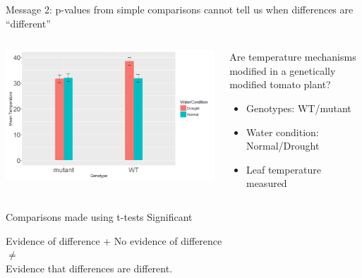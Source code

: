 \documentclass[10pt]{beamer}
\begin{document}
\begin{frame}{Message 2: p-values from simple comparisons cannot tell us when differences are “different”}
 \pause
  \begin{columns}
    \begin{column}{0.5\textwidth}
	\begin{center}
	\includegraphics[width=\textwidth]{Figures/message2}
	\end{center}
    \end{column}
    
    \begin{column}{0.5\textwidth}
    \begin{block}{Are temperature mechanisms modified in a genetically modified tomato plant?}
      \begin{itemize}
	\item Genotypes: WT/mutant 
	\item Water condition: Normal/Drought
	\item Leaf temperature measured
      \end{itemize}
      \end{block}
  
    \end{column}
  \end{columns}
   
   
   \begin{alertblock}{Comparisons made using t-tests}
   Significant 
   \pause
    \begin{center}
        Evidence of difference + No evidence of difference \\ $\neq$ \\ Evidence that differences are different.
    \end{center}

  \end{alertblock}
      
\end{frame}
\end{document}
